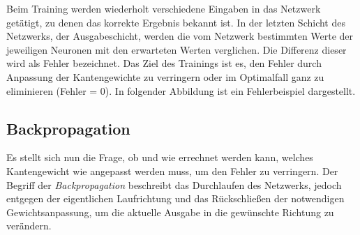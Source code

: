 Beim Training werden wiederholt verschiedene Eingaben in das Netzwerk getätigt,
zu denen das korrekte Ergebnis bekannt ist. In der letzten Schicht des Netzwerks,
der Ausgabeschicht, werden die vom Netzwerk bestimmten Werte der jeweiligen
Neuronen mit den erwarteten Werten verglichen.
Die Differenz dieser wird als Fehler bezeichnet.
Das Ziel des Trainings ist es, den Fehler durch Anpassung der Kantengewichte zu
verringern oder im Optimalfall ganz zu eliminieren (Fehler = 0).
In folgender Abbildung ist ein Fehlerbeispiel dargestellt.

\begin{figure}[H]
\end{figure}

\subsection{Backpropagation}

Es stellt sich nun die Frage, ob und wie errechnet werden kann, welches
Kantengewicht wie angepasst werden muss, um den Fehler zu verringern.
Der Begriff der \emph{Backpropagation} beschreibt das Durchlaufen des Netzwerks,
jedoch entgegen der eigentlichen Laufrichtung und das Rückschließen der
notwendigen Gewichtsanpassung, um die aktuelle Ausgabe in die gewünschte
Richtung zu verändern.

